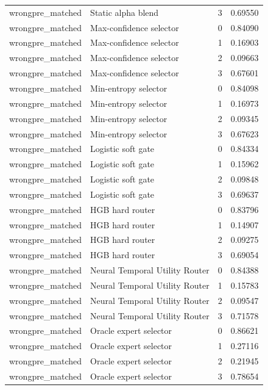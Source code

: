 \begin{tabular}{llrr}
wrongpre\_matched & Static alpha blend & 3 & 0.69550 \\
wrongpre\_matched & Max-confidence selector & 0 & 0.84090 \\
wrongpre\_matched & Max-confidence selector & 1 & 0.16903 \\
wrongpre\_matched & Max-confidence selector & 2 & 0.09663 \\
wrongpre\_matched & Max-confidence selector & 3 & 0.67601 \\
wrongpre\_matched & Min-entropy selector & 0 & 0.84098 \\
wrongpre\_matched & Min-entropy selector & 1 & 0.16973 \\
wrongpre\_matched & Min-entropy selector & 2 & 0.09345 \\
wrongpre\_matched & Min-entropy selector & 3 & 0.67623 \\
wrongpre\_matched & Logistic soft gate & 0 & 0.84334 \\
wrongpre\_matched & Logistic soft gate & 1 & 0.15962 \\
wrongpre\_matched & Logistic soft gate & 2 & 0.09848 \\
wrongpre\_matched & Logistic soft gate & 3 & 0.69637 \\
wrongpre\_matched & HGB hard router & 0 & 0.83796 \\
wrongpre\_matched & HGB hard router & 1 & 0.14907 \\
wrongpre\_matched & HGB hard router & 2 & 0.09275 \\
wrongpre\_matched & HGB hard router & 3 & 0.69054 \\
wrongpre\_matched & Neural Temporal Utility Router & 0 & 0.84388 \\
wrongpre\_matched & Neural Temporal Utility Router & 1 & 0.15783 \\
wrongpre\_matched & Neural Temporal Utility Router & 2 & 0.09547 \\
wrongpre\_matched & Neural Temporal Utility Router & 3 & 0.71578 \\
wrongpre\_matched & Oracle expert selector & 0 & 0.86621 \\
wrongpre\_matched & Oracle expert selector & 1 & 0.27116 \\
wrongpre\_matched & Oracle expert selector & 2 & 0.21945 \\
wrongpre\_matched & Oracle expert selector & 3 & 0.78654 \\
\bottomrule
\end{tabular}

